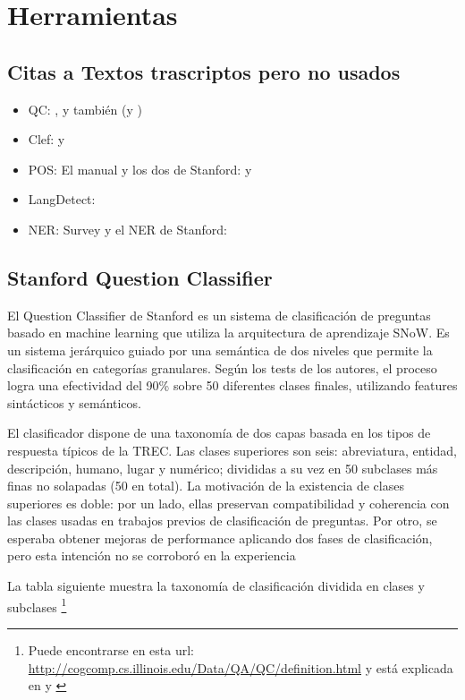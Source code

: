 \appendix
\chapter{Herramientas}
\label{chap:herramientas}
\section{Citas a Textos trascriptos pero no usados}
\begin{itemize}
\item QC: \cite{QC1}, \cite{QC2} y también \cite{QC3} (y \cite{QC-other})
\item Clef: \cite{GuidelineClef07} y \cite{OverviewClef07} 
\item POS: El manual \cite{POS0} y los dos de Stanford: \cite{POS1} y \cite{POS2}
\item LangDetect: \cite{nakatani2010langdetect}
\item NER: Survey \cite{NER1} y el NER de Stanford: \cite{NER2}
\end{itemize}

\section{Stanford Question Classifier}
\label{sec:stanford-qc}
El Question Classifier de Stanford \cite{QC2} es un sistema de clasificación de preguntas basado en machine learning que utiliza la arquitectura de aprendizaje SNoW. Es un sistema jerárquico guiado por una semántica de dos niveles que permite la clasificación en categorías granulares. Según los tests de los autores, el proceso logra una efectividad del 90\% sobre 50 diferentes clases finales, utilizando features sintácticos y semánticos. 

El clasificador dispone de una taxonomía de dos capas basada en los tipos de respuesta típicos de la TREC. Las clases superiores son seis: abreviatura, entidad, descripción, humano, lugar y numérico; divididas a su vez en 50 subclases más finas no solapadas (50 en total). La motivación de la existencia de clases superiores es doble: por un lado, ellas preservan compatibilidad y coherencia con las clases usadas en trabajos previos de clasificación de preguntas. Por otro, se esperaba obtener mejoras de performance aplicando dos fases de clasificación, pero esta intención no se corroboró en la experiencia

La tabla siguiente muestra la taxonomía de clasificación dividida en clases y subclases \footnote{Puede encontrarse en esta url: \url{http://cogcomp.cs.illinois.edu/Data/QA/QC/definition.html} y está explicada en \cite{QC2} y \cite{QC3}} 



